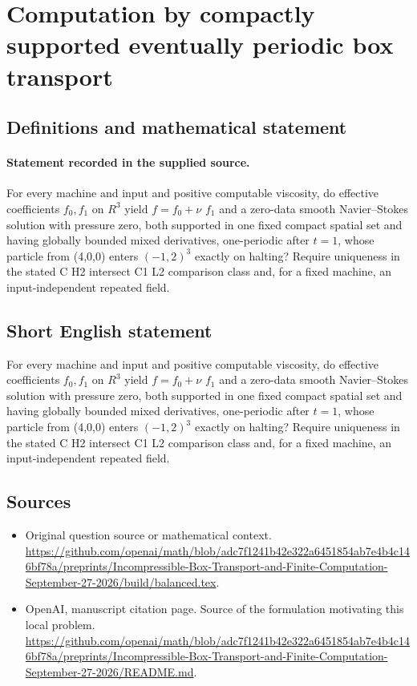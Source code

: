 \documentclass[11pt]{article}
\begin{document}
\section*{Computation by compactly supported eventually periodic box transport}\label{30007323}
\subsection{Definitions and mathematical statement}
\paragraph{Statement recorded in the supplied source.}
For every machine and input and positive computable viscosity, do effective coefficients $f_0,f_1$ on $R^3$ yield $f=f_0+\nu $ $f_1$ and a zero-data smooth Navier–Stokes solution with pressure zero, both supported in one fixed compact spatial set and having globally bounded mixed derivatives, one-periodic after $t=1$, whose particle from (4,0,0) enters $(-1,2)^3$ exactly on halting? Require uniqueness in the stated C H2 intersect C1 L2 comparison class and, for a fixed machine, an input-independent repeated field.
\subsection{Short English statement}
For every machine and input and positive computable viscosity, do effective coefficients $f_0,f_1$ on $R^3$ yield $f=f_0+\nu $ $f_1$ and a zero-data smooth Navier–Stokes solution with pressure zero, both supported in one fixed compact spatial set and having globally bounded mixed derivatives, one-periodic after $t=1$, whose particle from (4,0,0) enters $(-1,2)^3$ exactly on halting? Require uniqueness in the stated C H2 intersect C1 L2 comparison class and, for a fixed machine, an input-independent repeated field.
\subsection{Sources}
\begin{itemize}
\item[S1] Original question source or mathematical context.
\url{https://github.com/openai/math/blob/adc7f1241b42e322a6451854ab7e4b4c146bf78a/preprints/Incompressible-Box-Transport-and-Finite-Computation-September-27-2026/build/balanced.tex}.
\item[S2] OpenAI, manuscript citation page. Source of the formulation motivating this local problem.
\url{https://github.com/openai/math/blob/adc7f1241b42e322a6451854ab7e4b4c146bf78a/preprints/Incompressible-Box-Transport-and-Finite-Computation-September-27-2026/README.md}.
\end{itemize}
\end{document}
